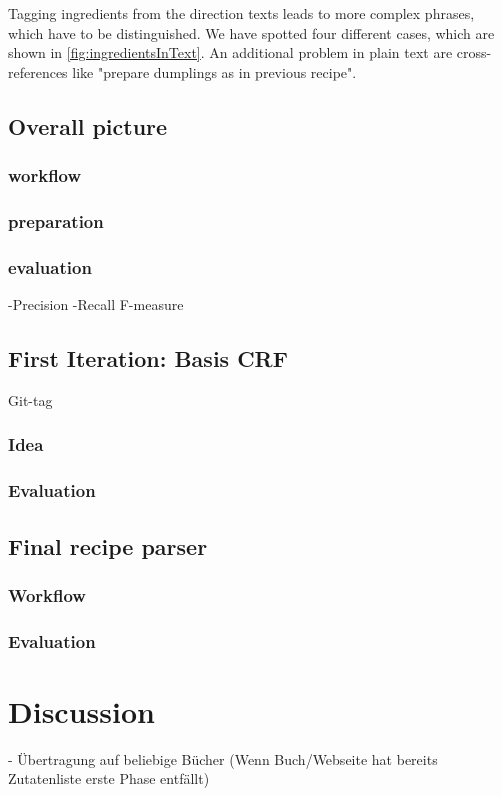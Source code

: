\documentclass[12pt, twoside]{report}
\begin{document}
Tagging ingredients from the direction texts leads to more complex phrases, which have to be distinguished. We have spotted four different cases, which are shown in \cref{fig:ingredientsInText}. An additional problem in plain text are cross-references like "prepare dumplings as in previous recipe".

\section{Overall picture}
\subsection{workflow}
\subsection{preparation}
\subsection{evaluation}
-Precision -Recall F-measure

\section{First Iteration: Basis CRF}
Git-tag
\subsection{Idea}
\subsection{Evaluation}

\section{Final recipe parser}
\subsection{Workflow}
\subsection{Evaluation}





\chapter{Discussion}
- Übertragung auf beliebige Bücher (Wenn Buch/Webseite hat bereits Zutatenliste erste Phase entfällt)
\end{document}
